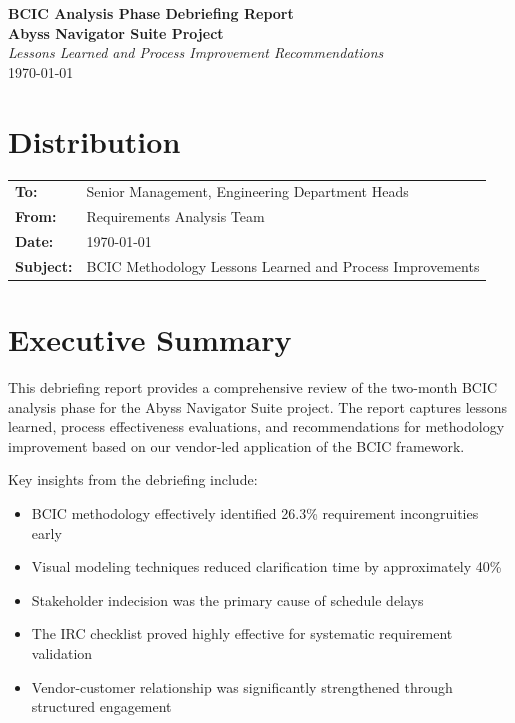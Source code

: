 \documentclass[12pt,a4paper]{article}
\begin{document}
\begin{center}
\Large\textbf{BCIC Analysis Phase Debriefing Report}\\
\large\textbf{Abyss Navigator Suite Project}\\
\vspace{0.5cm}
\large\textit{Lessons Learned and Process Improvement Recommendations}\\
\vspace{0.5cm}
\today
\end{center}

\vspace{1cm}

\section*{Distribution}
\begin{tabular}{ll}
\textbf{To:} & Senior Management, Engineering Department Heads \\
\textbf{From:} & Requirements Analysis Team \\
\textbf{Date:} & \today \\
\textbf{Subject:} & BCIC Methodology Lessons Learned and Process Improvements \\
\end{tabular}

\section*{Executive Summary}

This debriefing report provides a comprehensive review of the two-month BCIC analysis phase for the Abyss Navigator Suite project. The report captures lessons learned, process effectiveness evaluations, and recommendations for methodology improvement based on our vendor-led application of the BCIC framework.

Key insights from the debriefing include:
\begin{itemize}
    \item BCIC methodology effectively identified 26.3\% requirement incongruities early
    \item Visual modeling techniques reduced clarification time by approximately 40\%
    \item Stakeholder indecision was the primary cause of schedule delays
    \item The IRC checklist proved highly effective for systematic requirement validation
    \item Vendor-customer relationship was significantly strengthened through structured engagement
\end{itemize}
\end{document}
